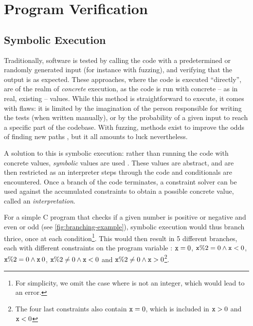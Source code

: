 \section{Program Verification}

\subsection{Symbolic Execution}

Traditionally, software is tested by calling the code with a predetermined or randomly generated input (for instance with fuzzing), and verifying that the output is as expected. These approaches, where the code is executed ``directly'', are of the realm of \emph{concrete} execution, as the code is run with concrete -- as in real, existing -- values. While this method is straightforward to execute, it comes with flaws: it is limited by the imagination of the person responsible for writing the tests (when written manually), or by the probability of a given input to reach a specific part of the codebase. With fuzzing, methods exist to improve the odds of finding new paths \cite{smartfuzzing}, but it all amounts to luck nevertheless.

A solution to this is symbolic execution: rather than running the code with concrete values, \emph{symbolic} values are used \cite{surveysymex}. These values are abstract, and are then restricted as an interpreter steps through the code and conditionals are encountered. Once a branch of the code terminates, a constraint solver can be used against the accumulated constraints to obtain a possible concrete value, called an \emph{interpretation}.

For a simple C program that checks if a given number is positive or negative and even or odd (see \autoref{fig:branching-example}), symbolic execution would thus branch thrice, once at each condition\footnote{For simplicity, we omit the case where  is not an integer, which would lead to an error.}. This would then result in 5 different branches, each with different constraints on the program variable : $\texttt{x} = 0$, $\texttt{x}\%2=0 \land \texttt{x}<0$, $\texttt{x}\%2=0 \land \texttt{x}\>0$, $\texttt{x}\%2\neq0 \land \texttt{x}<0$ and $\texttt{x}\%2\neq0 \land \texttt{x}>0$\footnote{The four last constraints also contain $\texttt{x} = 0$, which is included in $\texttt{x}>0$ and $\texttt{x}<0$}.

